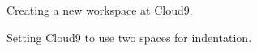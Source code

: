 \begin{figure}
\begin{center}
\end{center}
\caption{Creating a new workspace at Cloud9.\label{fig:cloud9_new_workspace}}
\end{figure}

\begin{figure}
\begin{center}
\end{center}
\caption{Setting Cloud9 to use two spaces for indentation.\label{fig:cloud9_two_spaces}}
\end{figure}